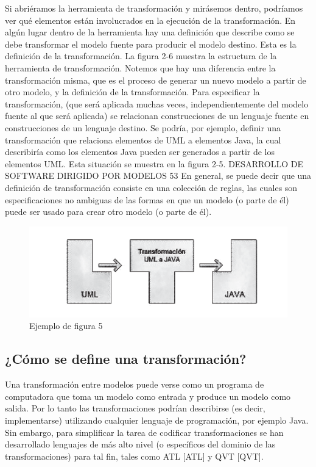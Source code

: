 Si abriéramos la herramienta de transformación y mirásemos dentro, podríamos ver qué elementos están involucrados en la ejecución de la transformación. En algún lugar dentro de la herramienta hay una definición que describe como se debe transformar el modelo fuente para producir el modelo destino. Esta es la definición de la transformación. La figura 2-6 muestra la estructura de la herramienta de transformación. Notemos que hay una diferencia entre la transformación misma, que es el proceso de generar un nuevo modelo a partir de otro modelo, y la definición de la transformación. Para especificar la transformación, (que será aplicada muchas veces, independientemente del modelo fuente al que será aplicada) se relacionan construcciones de un lenguaje fuente en construcciones de un lenguaje destino. Se podría, por ejemplo, definir una transformación que relaciona elementos de UML a elementos Java, la cual describiría como los elementos Java pueden ser generados a partir de los elementos UML. Esta situación se muestra en la figura 2-5. DESARROLLO DE SOFTWARE DIRIGIDO POR MODELOS 53 En general, se puede decir que una definición de transformación consiste en una colección de reglas, las cuales son especificaciones no ambiguas de las formas en que un modelo (o parte de él) puede ser usado para crear otro modelo (o parte de él).\\

\begin{figure}[H]
\centering
\includegraphics[scale=0.9]{./Imagenes/modelo5}
\caption{Ejemplo de figura 5}
\label{figura5}
\end{figure}

\subsection{¿Cómo se define una transformación?}
 Una transformación entre modelos puede verse como un programa de computadora que toma un modelo como entrada y produce un modelo como salida. Por lo tanto las transformaciones podrían describirse (es decir, implementarse) utilizando cualquier lenguaje de programación, por ejemplo Java. Sin embargo, para simplificar la tarea de codificar transformaciones se han desarrollado lenguajes de más alto nivel (o específicos del dominio de las transformaciones) para tal fin, tales como ATL [ATL] y QVT [QVT].
 
